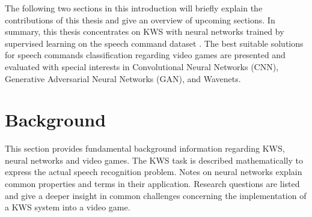The following two sections in this introduction will briefly explain the contributions of this thesis and give an overview of upcoming sections.
In summary, this thesis concentrates on KWS with neural networks trained by supervised learning on the speech command dataset \cite{Warden2018}.
The best suitable solutions for speech commands classification regarding video games are presented and evaluated with special interests in Convolutional Neural Networks (CNN), Generative Adversarial Neural Networks (GAN), and Wavenets.







\chapter{Background}\label{sec:back}
This section provides fundamental background information regarding KWS, neural networks and video games.
The KWS task is described mathematically to express the actual speech recognition problem.
Notes on neural networks explain common properties and terms in their application.
Research questions are listed and give a deeper insight in common challenges concerning the implementation of a KWS system into a video game.





